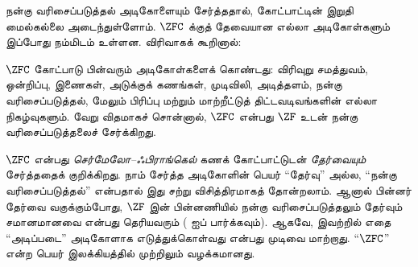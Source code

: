 \documentclass[../../../include/open-logic-section]{subfiles}
\begin{document}

நன்கு வரிசைப்படுத்தல் அடிகோளையும் சேர்த்ததால், கோட்பாட்டின் இறுதி
மைல்கல்லை அடைந்துள்ளோம். $\ZFC$ க்குத் தேவையான எல்லா அடிகோள்களும்
இப்போது நம்மிடம் உள்ளன. விரிவாகக் கூறினால்:

\begin{defn}
$\ZFC$ கோட்பாடு பின்வரும் அடிகோள்களைக் கொண்டது: விரிவுறு
சமத்துவம், ஒன்றிப்பு, இணைகள், அடுக்குக் கணங்கள், முடிவிலி,
அடித்தளம், நன்கு வரிசைப்படுத்தல், மேலும் பிரிப்பு மற்றும்
மாற்றீட்டுத் திட்டவடிவங்களின் எல்லா நிகழ்வுகளும்.
வேறு விதமாகச் சொன்னால், $\ZFC$ என்பது $\ZF$ உடன்
நன்கு வரிசைப்படுத்தலைச் சேர்க்கிறது.
\end{defn}

$\ZFC$ என்பது \emph{செர்மேலோ--ஃபிராங்கெல்} கணக் கோட்பாட்டுடன்
\emph{தேர்வையும்} சேர்த்ததைக் குறிக்கிறது. நாம் சேர்த்த அடிகோளின்
பெயர் ``தேர்வு'' அல்ல, ``நன்கு வரிசைப்படுத்தல்'' என்பதால் இது சற்று
விசித்திரமாகத் தோன்றலாம். ஆனால் பின்னர் {தேர்வை} வகுக்கும்போது,
$\ZF$ இன் பின்னணியில் நன்கு வரிசைப்படுத்தலும் தேர்வும் சமானமானவை
என்பது தெரியவரும் ( ஐப் பார்க்கவும்).
ஆகவே, இவற்றில் எதை ``அடிப்படை'' அடிகோளாக எடுத்துக்கொள்வது என்பது
முடிவை மாற்றாது. ``$\ZFC$'' என்ற பெயர் இலக்கியத்தில் முற்றிலும்
வழக்கமானது.
\end{document}

